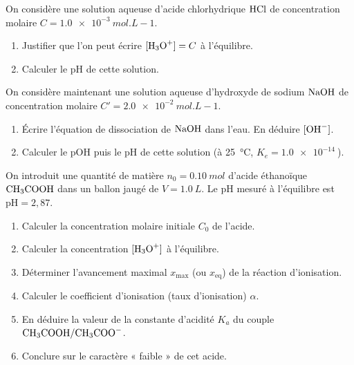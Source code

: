 \documentclass[11pt]{article}
\begin{document}
\begin{exercice}
On considère une solution aqueuse d'acide chlorhydrique $\ce{HCl}$ de concentration molaire $C = \SI{1,0e-3}{mol.L-1}$.
\begin{enumerate}
    \item Justifier que l'on peut écrire $[\ce{H3O+}] = C$ à l'équilibre.
    \item Calculer le pH de cette solution.
\end{enumerate}
On considère maintenant une solution aqueuse d'hydroxyde de sodium $\ce{NaOH}$ de concentration molaire $C' = \SI{2,0e-2}{mol.L-1}$.
\begin{enumerate}[resume]
    \item Écrire l'équation de dissociation de $\ce{NaOH}$ dans l'eau. En déduire $[\ce{OH-}]$.
    \item Calculer le pOH puis le pH de cette solution (à \SI{25}{\celsius}, $K_e = \SI{1,0e-14}{}$).
\end{enumerate}
\end{exercice}

\begin{exercice}
On introduit une quantité de matière $n_0 = \SI{0,10}{mol}$ d'acide éthanoïque $\ce{CH3COOH}$ dans un ballon jaugé de $V = \SI{1,0}{L}$. Le pH mesuré à l'équilibre est $\text{pH} = 2,87$.
\begin{enumerate}
    \item Calculer la concentration molaire initiale $C_0$ de l'acide.
    \item Calculer la concentration $[\ce{H3O+}]$ à l'équilibre.
    \item Déterminer l'avancement maximal $x_{\max}$ (ou $x_{\text{eq}}$) de la réaction d'ionisation.
    \item Calculer le coefficient d'ionisation (taux d'ionisation) $\alpha$.
    \item En déduire la valeur de la constante d'acidité $K_a$ du couple $\ce{CH3COOH/CH3COO-}$.
    \item Conclure sur le caractère « faible » de cet acide.
\end{enumerate}
\end{exercice}
\end{document}
